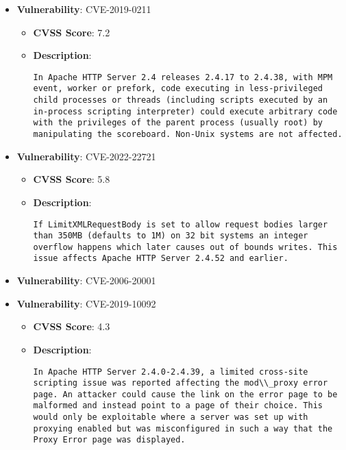 \documentclass{article}
\begin{document}
\begin{itemize}
        \item \textbf{Vulnerability}: CVE-2019-0211
        \begin{itemize}
            \item \textbf{CVSS Score}:  7.2 
            \item \textbf{Description}:
            \parbox[t]{0.9\linewidth}{
                \verb|In Apache HTTP Server 2.4 releases 2.4.17 to 2.4.38, with MPM event, worker or prefork, code executing in less-privileged child processes or threads (including scripts executed by an in-process scripting interpreter) could execute arbitrary code with the privileges of the parent process (usually root) by manipulating the scoreboard. Non-Unix systems are not affected.|
            }
        \end{itemize}
    
        \item \textbf{Vulnerability}: CVE-2022-22721
        \begin{itemize}
            \item \textbf{CVSS Score}:  5.8 
            \item \textbf{Description}:
            \parbox[t]{0.9\linewidth}{
                \verb|If LimitXMLRequestBody is set to allow request bodies larger than 350MB (defaults to 1M) on 32 bit systems an integer overflow happens which later causes out of bounds writes. This issue affects Apache HTTP Server 2.4.52 and earlier.|
            }
        \end{itemize}
    
        \item \textbf{Vulnerability}: CVE-2006-20001
    
        \item \textbf{Vulnerability}: CVE-2019-10092
        \begin{itemize}
            \item \textbf{CVSS Score}:  4.3 
            \item \textbf{Description}:
            \parbox[t]{0.9\linewidth}{
                \verb|In Apache HTTP Server 2.4.0-2.4.39, a limited cross-site scripting issue was reported affecting the mod\\_proxy error page. An attacker could cause the link on the error page to be malformed and instead point to a page of their choice. This would only be exploitable where a server was set up with proxying enabled but was misconfigured in such a way that the Proxy Error page was displayed.|
            }
        \end{itemize}
    

\end{itemize}
\end{document}
